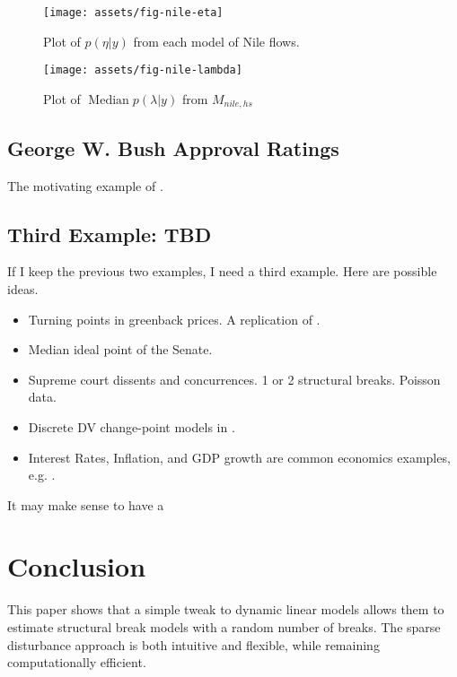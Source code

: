 \documentclass{article}
\DeclareMathOperator{\Median}{Median}
\begin{document}
\begin{figure}[htpb]
  \centering
  \texttt{[image: assets/fig-nile-eta]}
  \caption{Plot of $p(\eta | y)$ from each model of Nile flows.}
  \label{fig:nile-eta}
\end{figure}

\begin{figure}[htpb]
  \centering
  \texttt{[image: assets/fig-nile-lambda]}
  \caption{Plot of $\Median p(\lambda | y)$ from $M_{nile,hs}$}
  \label{fig:nile-lambda}
\end{figure}

\clearpage{}

\subsection{George W. Bush Approval Ratings}
\label{sec:george-w.-bush}

The motivating example of \textcite{RatkovicEng2010}.

\subsection{Third Example: TBD}

If I keep the previous two examples, I need a third example.
Here are possible ideas.

\begin{itemize}
\item Turning points in greenback prices. A replication of \textcite{WillardGuinnaneEtAl1996}.
\item Median ideal point of the Senate. \parencites{RatkovicEng2010}
\item Supreme court dissents and concurrences. 1 or 2 structural breaks. Poisson data. \parencite{CalderiaZorn1998}
\item Discrete DV change-point models in \parencite{Spirling2007b}.
\item Interest Rates, Inflation, and GDP growth are common economics examples, e.g. \textcite{GiordaniKohn2008}.
\end{itemize}

It may make sense to have a 

\section{Conclusion}
\label{sec:conclusion}

This paper shows that a simple tweak to dynamic linear models allows them to estimate structural break models with a random number of breaks.
The sparse disturbance approach is both intuitive and flexible, while remaining computationally efficient.
\end{document}
